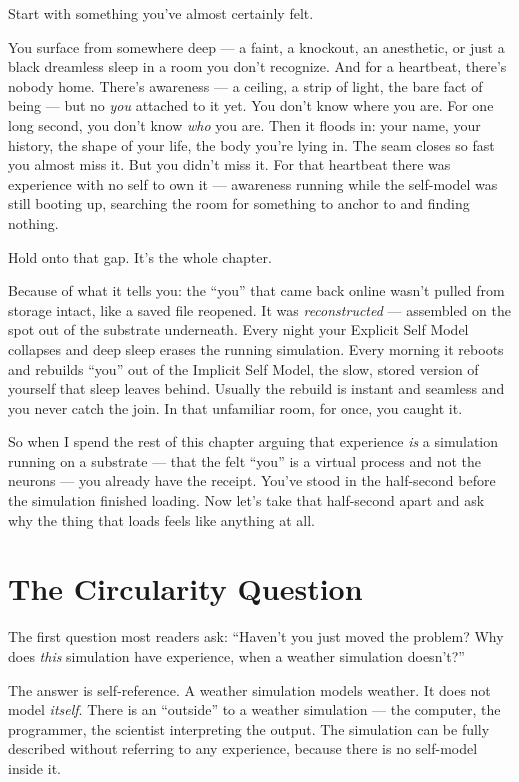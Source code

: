 \documentclass[11pt, twoside, openright]{book}
\begin{document}
Start with something you've almost certainly felt.

You surface from somewhere deep --- a faint, a knockout, an anesthetic, or just a black dreamless sleep in a room you don't recognize. And for a heartbeat, there's nobody home. There's awareness --- a ceiling, a strip of light, the bare fact of being --- but no \textit{you} attached to it yet. You don't know where you are. For one long second, you don't know \textit{who} you are. Then it floods in: your name, your history, the shape of your life, the body you're lying in. The seam closes so fast you almost miss it. But you didn't miss it. For that heartbeat there was experience with no self to own it --- awareness running while the self-model was still booting up, searching the room for something to anchor to and finding nothing.

Hold onto that gap. It's the whole chapter.

Because of what it tells you: the ``you'' that came back online wasn't pulled from storage intact, like a saved file reopened. It was \textit{reconstructed} --- assembled on the spot out of the substrate underneath. Every night your Explicit Self Model collapses and deep sleep erases the running simulation. Every morning it reboots and rebuilds ``you'' out of the Implicit Self Model, the slow, stored version of yourself that sleep leaves behind. Usually the rebuild is instant and seamless and you never catch the join. In that unfamiliar room, for once, you caught it.

So when I spend the rest of this chapter arguing that experience \textit{is} a simulation running on a substrate --- that the felt ``you'' is a virtual process and not the neurons --- you already have the receipt. You've stood in the half-second before the simulation finished loading. Now let's take that half-second apart and ask why the thing that loads feels like anything at all.

\section*{The Circularity Question}

The first question most readers ask: ``Haven't you just moved the problem? Why does \textit{this} simulation have experience, when a weather simulation doesn't?''

The answer is self-reference. A weather simulation models weather. It does not model \textit{itself}. There is an ``outside'' to a weather simulation --- the computer, the programmer, the scientist interpreting the output. The simulation can be fully described without referring to any experience, because there is no self-model inside it.
\end{document}
